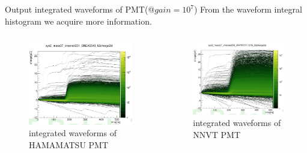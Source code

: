 \documentclass[11pt,compress,xcolor=x11names,UTF8]{beamer}
\begin{document}
\begin{frame}{Output integrated waveforms of PMT(@$gain=10^7$)}
From the waveform integral histogram we acquire more information.
\begin{columns}
\begin{column}{.5\textwidth}
\begin{figure}
\centering
\includegraphics[width=\textwidth]{figures/hambaseline2d.png} %
\caption{integrated waveforms of HAMAMATSU PMT}
\end{figure}
\end{column}
\begin{column}{.5\textwidth}
\begin{figure}
\centering
\includegraphics[width=\textwidth]{figures/mcpbaseline2d.png} %
\caption{integrated waveforms of NNVT PMT}
\end{figure}
\end{column}
\end{columns}
\end{frame}
\end{document}
